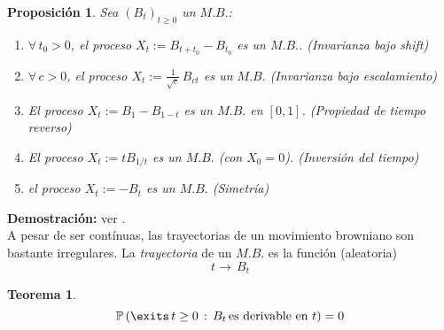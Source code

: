 \documentclass[a4paper]{article}
\newcommand{\prob}{\mathbb{P}}
\newtheorem{teorema}{Teorema}
\newtheorem{prop}{Proposici\'on}
\numberwithin{equation}{subsection}
\numberwithin{definicion}{subsection}
\begin{document}
\begin{prop} Sea $(B_t)_{t\geq 0}$ un $M.B.$:
\begin{enumerate}
    \item[a.] $\forall\,t_0>0$, el proceso $X_t := B_{t+t_0}-B_{t_0}$ es un $M.B.$. (Invarianza bajo shift)
    \item[b.] $\forall\,c>0$, el proceso $X_t := \frac{1}{\sqrt{c}}\,B_{ct}$ es un $M.B.$ (Invarianza bajo escalamiento)
    \item[c.] El proceso $X_t := B_1 - B_{1-t}$ es un $M.B.$ en $[0,1]$. (Propiedad de tiempo reverso)
    \item[d.]  El proceso $X_t:=tB_{1/t}$ es un $M.B.$ (con $X_0 =0$). (Inversión del tiempo)
    \item[e.] el proceso $X_t:=-B_t$ es un $M.B.$ (Simetría)
\end{enumerate}
\end{prop}
\textbf{Demostración: }ver \cite[cap. 2]{Kara}.\\ \newline
A pesar de ser contínuas, las trayectorias de un movimiento browniano son bastante irregulares. La \textit{trayectoria} de un $M.B.$ es la función (aleatoria)
\[t\rightarrow\,B_t\]
\begin{teorema}
\[\prob\left(\exits\,t\geq 0\,:\,B_t\,\text{es derivable en }t\right) = 0\]
\end{teorema}
\end{document}
